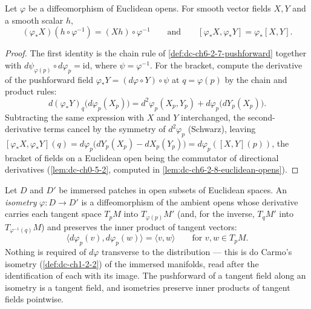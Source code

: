 \begin{lemma}
  \label{lem:dc-ch6-2-7-pushforward-naturality}
  \leanok
  Let $\varphi$ be a diffeomorphism of Euclidean opens. For smooth vector
  fields $X,Y$ and a smooth scalar $h$,
  $$
  (\varphi_*X)(h\circ\varphi^{-1})=(Xh)\circ\varphi^{-1}
  \qquad\text{and}\qquad
  [\varphi_*X,\varphi_*Y]=\varphi_*[X,Y].
  $$
\end{lemma}
\begin{proof}
  \leanok
  The first identity is the chain rule of \cref{def:dc-ch6-2-7-pushforward}
  together with $d\psi_{\varphi(p)}\circ d\varphi_p=\mathrm{id}$, where
  $\psi=\varphi^{-1}$. For the bracket, compute the derivative of the
  pushforward field $\varphi_*Y=(d\varphi\circ Y)\circ\psi$ at
  $q=\varphi(p)$ by the chain and product rules:
  $$
  d(\varphi_*Y)_q\bigl(d\varphi_p(X_p)\bigr)
    = d^2\varphi_p(X_p,Y_p)+d\varphi_p\bigl(dY_p(X_p)\bigr).
  $$
  Subtracting the same expression with $X$ and $Y$ interchanged, the
  second-derivative terms cancel by the symmetry of $d^2\varphi_p$ (Schwarz),
  leaving
  $[\varphi_*X,\varphi_*Y](q)
    =d\varphi_p\bigl(dY_p(X_p)-dX_p(Y_p)\bigr)=d\varphi_p([X,Y](p))$,
  the bracket of fields on a Euclidean open being the commutator of directional
  derivatives (\cref{lem:dc-ch0-5-2}, computed in
  \cref{lem:dc-ch6-2-8-euclidean-opens}).
\end{proof}

\begin{definition}
  \label{def:dc-ch6-2-7-isometry}
  \leanok
  Let $D$ and $D'$ be immersed patches in open subsets of Euclidean spaces. An
  \emph{isometry} $\varphi:D\to D'$ is a diffeomorphism of the ambient opens
  whose derivative carries each tangent space $T_pM$ into
  $T_{\varphi(p)}M'$ (and, for the inverse, $T_qM'$ into
  $T_{\varphi^{-1}(q)}M$) and preserves the inner product of tangent vectors:
  $$
  \langle d\varphi_p(v),d\varphi_p(w)\rangle=\langle v,w\rangle
  \qquad\text{for } v,w\in T_pM.
  $$
  Nothing is required of $d\varphi$ transverse to the distribution — this is
  do Carmo's isometry (\cref{def:dc-ch1-2-2}) of the immersed manifolds, read
  after the identification of each with its image. The pushforward of a
  tangent field along an isometry is a tangent field, and isometries preserve
  inner products of tangent fields pointwise.
\end{definition}

